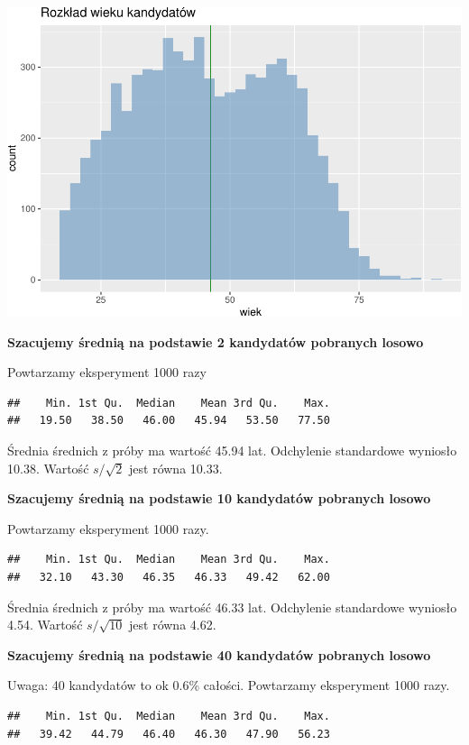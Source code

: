 \documentclass[
  openany]{book}
\begin{document}
\includegraphics{_main_files/figure-latex/unnamed-chunk-29-1.pdf}

\textbf{Szacujemy średnią na podstawie 2 kandydatów pobranych losowo}

Powtarzamy eksperyment 1000 razy

\begin{verbatim}
##    Min. 1st Qu.  Median    Mean 3rd Qu.    Max. 
##   19.50   38.50   46.00   45.94   53.50   77.50
\end{verbatim}

Średnia średnich z próby ma wartość 45.94 lat.
Odchylenie standardowe wyniosło 10.38.
Wartość \(s/\sqrt{2}\) jest równa 10.33.

\textbf{Szacujemy średnią na podstawie 10 kandydatów pobranych losowo}

Powtarzamy eksperyment 1000 razy.

\begin{verbatim}
##    Min. 1st Qu.  Median    Mean 3rd Qu.    Max. 
##   32.10   43.30   46.35   46.33   49.42   62.00
\end{verbatim}

Średnia średnich z próby ma wartość 46.33 lat.
Odchylenie standardowe wyniosło 4.54.
Wartość \(s/\sqrt{10}\) jest równa 4.62.

\textbf{Szacujemy średnią na podstawie 40 kandydatów pobranych losowo}

Uwaga: 40 kandydatów to ok 0.6\% całości.
Powtarzamy eksperyment 1000 razy.

\begin{verbatim}
##    Min. 1st Qu.  Median    Mean 3rd Qu.    Max. 
##   39.42   44.79   46.40   46.30   47.90   56.23
\end{verbatim}
\end{document}

